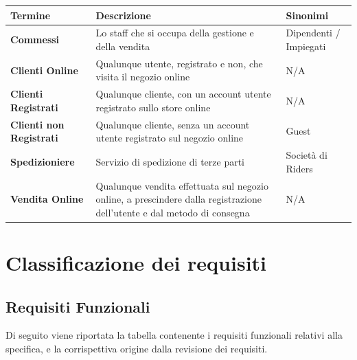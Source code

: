 \documentclass[12pt, a4paper]{article}
\begin{document}
\begin{center}
\begin{tabularx}{0.95\textwidth}{|X|X|X|}
\hline
\textbf{Termine} & \textbf{Descrizione} & \textbf{Sinonimi} \\
\hline
\textbf{Commessi} & Lo staff che si occupa della gestione e della vendita & Dipendenti / Impiegati \\
\hline
\textbf{Clienti Online} & Qualunque utente, registrato e non, che visita il negozio online & N/A \\
\hline
\textbf{Clienti Registrati} & Qualunque cliente, con un account utente registrato sullo store online & N/A \\
\hline
\textbf{Clienti non Registrati} & Qualunque cliente, senza un account utente registrato sul negozio online & Guest \\
\hline
\textbf{Spedizioniere} & Servizio di spedizione di terze parti & Società di Riders \\
\hline
\textbf{Vendita Online} & Qualunque vendita effettuata sul negozio online, a prescindere dalla registrazione dell'utente e dal metodo di consegna & N/A \\
\hline
\end{tabularx}
\end{center}

\section{Classificazione dei requisiti}
\subsection{Requisiti Funzionali}
Di seguito viene riportata la tabella contenente i requisiti funzionali relativi alla specifica, e la corrispettiva origine dalla revisione dei requisiti.
\end{document}
